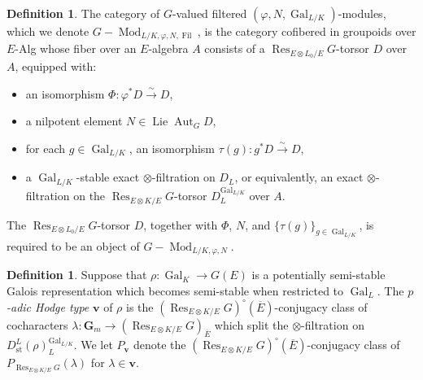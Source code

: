 \documentclass{amsart}
\renewcommand{\mathbb}{\mathbf}
\DeclareMathOperator{\Lie}{Lie}
\newcommand{\To}{\longrightarrow}
\newcommand{\isoto}{\stackrel{\sim}{\To}}
\theoremstyle{definition}
\newtheorem{defn}[subsubsection]{Definition}
\theoremstyle{remark}
\newcommand{\GG}{{\mathbb G}}
\DeclareMathOperator{\Aut}{Aut}
\DeclareMathOperator{\Fil}{Fil}
\DeclareMathOperator{\Gal}{Gal}
\DeclareMathOperator{\Mod}{Mod}
\newcommand{\st}{\mathrm{st}}
\newcommand{\Gm}{\GG_m}
\newcommand{\Res}{\operatorname{Res}}
\begin{document}
\begin{defn}
The category of $G$-valued filtered $(\varphi,N,\Gal_{L/K})$-modules, which we denote $G-\Mod_{L/K,\varphi,N,\Fil}$, is the category cofibered in groupoids over $E$-Alg whose fiber over an $E$-algebra $A$ consists of a $\Res_{E\otimes L_0/E}G$-torsor $D$ over $A$, equipped with:
\begin{itemize}
\item	an isomorphism $\Phi:\varphi^\ast D\isoto D$,
\item	a nilpotent element $N\in\Lie\Aut_GD$,
\item	for each $g\in\Gal_{L/K}$, an isomorphism $\tau(g):g^\ast D\isoto D$,
\item	a $\Gal_{L/K}$-stable exact $\otimes$-filtration on $D_L$, or equivalently, an exact $\otimes$-filtration on the $\Res_{E\otimes K/E}G$-torsor $D_L^{\Gal_{L/K}}$ over $A$.
\end{itemize}
The $\Res_{E\otimes L_0/E}G$-torsor $D$, together with $\Phi$, $N$, and $\{\tau(g)\}_{g\in\Gal_{L/K}}$, is required to be an object of $G-\Mod_{L/K,\varphi,N}$.
\end{defn}

\begin{defn}\label{defn: p adic Hodge type}
Suppose that $\rho:\Gal_K\rightarrow G(E)$ is a potentially semi-stable Galois representation which becomes semi-stable when restricted to $\Gal_L$.  The \emph{$p$-adic Hodge type} $\mathbf{v}$ of $\rho$ is the $(\Res_{E\otimes K/E}G)^\circ(\overline E)$-conjugacy class of cocharacters $\lambda:\Gm\rightarrow (\Res_{E\otimes K/E}G)_{\overline E}$ which split the $\otimes$-filtration on $D_{\st}^L(\rho)_L^{\Gal_{L/K}}$.  We let $P_{\mathbf{v}}$ denote the $(\Res_{E\otimes K/E}G)^\circ(\overline E)$-conjugacy class of $P_{\Res_{E\otimes K/E}G}(\lambda)$ for $\lambda\in\mathbf{v}$.
\end{defn}
\end{document}
